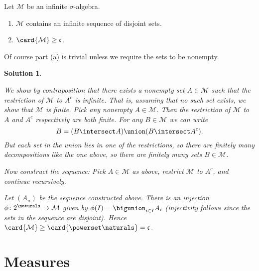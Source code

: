 \documentclass[article, a4paper, 11pt, oneside]{memoir}
\numberwithin{equation}{chapter}
\newcommand{\calM}{\mathcal{M}}
\theoremstyle{nonumberplain}
\newtheorem{solution}{Solution}
\begin{document}
\begin{exerciseframed*}[1]
    Let $\calM$ be an infinite $\sigma$-algebra.
    \begin{enumerate}
        \item $\calM$ contains an infinite sequence of disjoint sets.
        \item $\card{\calM} \geq \mathfrak{c}$.
    \end{enumerate}
\end{exerciseframed*}
%
Of course part (a) is trivial unless we require the sets to be nonempty.

\begin{solution}
\begin{solutionsec}
	\item We show by contraposition that there exists a nonempty set $A \in \calM$ such that the restriction of $\calM$ to $A^c$ is infinite. That is, assuming that no such set exists, we show that $\calM$ is finite. Pick any nonempty $A \in \calM$. Then the restriction of $\calM$ to $A$ and $A^c$ respectively are both finite. For any $B \in \calM$ we can write
	\begin{equation*}
		B = (B \intersect A) \union (B \intersect A^c).
	\end{equation*}
	But each set in the union lies in one of the restrictions, so there are finitely many decompositions like the one above, so there are finitely many sets $B \in \calM$.
	
	Now construct the sequence: Pick $A \in \calM$ as above, restrict $\calM$ to $A^c$, and continue recursively.
	
	\item Let $(A_n)$ be the sequence constructed above. There is an injection $\phi\colon 2^\naturals \to \calM$ given by $\phi(I) = \bigunion_{i \in I} A_i$ (injectivity follows since the sets in the sequence are disjoint). Hence $\card{\calM} \geq \card{\powerset\naturals} = \mathfrak{c}$.
\end{solutionsec}
\end{solution}





\section{Measures}
\end{document}
